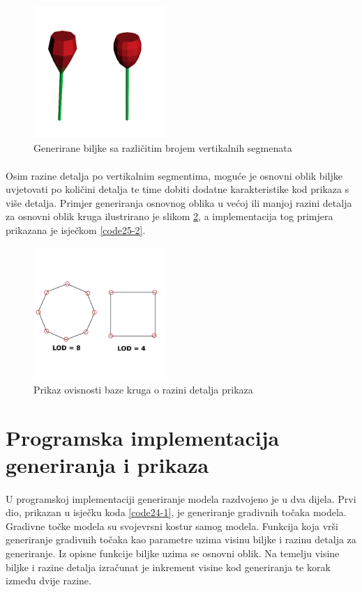 \documentclass[times, utf8, diplomski]{fer}
\begin{document}
\begin{figure}[h]
	\centering
	\includegraphics[width=0.45\textwidth]{img/221-1}
	\caption{Generirane biljke sa različitim brojem vertikalnih segmenata}
	\label{fig:221-1}
\end{figure}

\paragraph{}
Osim razine detalja po vertikalnim segmentima, moguće je osnovni oblik biljke uvjetovati po 
količini detalja te time dobiti dodatne karakteristike kod prikaza s više detalja. Primjer 
generiranja osnovnog oblika u većoj ili manjoj razini detalja za osnovni oblik kruga 
ilustrirano je slikom \ref{fig:221-2}, a implementacija tog primjera prikazana je isječkom 
\ref{code25-2}.

\begin{figure}[h]
	\centering
	\includegraphics[width=0.45\textwidth]{img/221-2}
	\caption{Prikaz ovisnosti baze kruga o razini detalja prikaza}
	\label{fig:221-2}
\end{figure}

\section{Programska implementacija generiranja i prikaza}
\paragraph{}
U programskoj implementaciji generiranje modela razdvojeno je u dva dijela. Prvi dio, prikazan u isječku koda \ref{code24-1}, je generiranje gradivnih točaka modela. Gradivne točke modela su svojevrsni kostur samog modela. Funkcija koja vrši generiranje gradivnih točaka kao parametre uzima visinu biljke i razinu detalja za generiranje. Iz opisne funkcije biljke uzima se osnovni oblik. Na temelju visine biljke i razine detalja izračunat je inkrement visine kod generiranja te korak između dvije razine.
\end{document}
